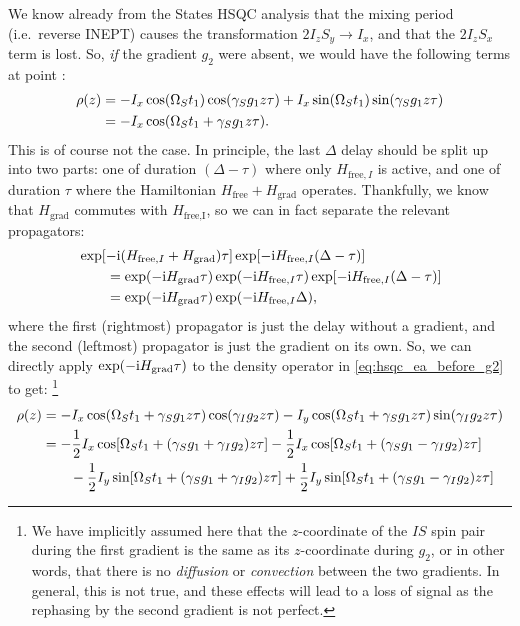 We know already from the States HSQC analysis that the mixing period (i.e.\ reverse INEPT) causes the transformation $2I_zS_y \to I_x$, and that the $2I_zS_x$ term is lost.
So, \textit{if} the gradient $g_2$ were absent, we would have the following terms at point :
\begin{align}
    \label{eq:hsqc_ea_before_g2}
    \rho(z) &= -I_x\cos(\Omega_S t_1)\cos(\gamma_S g_1 z \tau) + I_x\sin(\Omega_S t_1)\sin(\gamma_S g_1 z \tau) \notag \\
            &= -I_x\cos(\Omega_S t_1 + \gamma_S g_1 z\tau).
\end{align}
This is of course not the case.
In principle, the last $\Delta$ delay should be split up into two parts: one of duration $(\Delta - \tau)$ where only $H_{\text{free},I}$ is active, and one of duration $\tau$ where the Hamiltonian $H_\text{free} + H_\text{grad}$ operates.
Thankfully, we know that $H_\text{grad}$ commutes with $H_\text{free,I}$, so we can in fact separate the relevant propagators:
\begin{align}
    \label{eq:propagators_gradient_echo}
    \MoveEqLeft \exp[-\mi(H_{\text{free},I} + H_\text{grad})\tau]\exp[-\mi H_{\text{free},I}(\Delta - \tau)] \notag \\
    &= \exp(-\mi H_\text{grad}\tau) \exp(-\mi H_{\text{free},I}\tau)\exp[-\mi H_{\text{free},I}(\Delta - \tau)] \notag \\
    &= \exp(-\mi H_\text{grad}\tau) \exp(-\mi H_{\text{free},I}\Delta),
\end{align}
where the first (rightmost) propagator is just the delay without a gradient, and the second (leftmost) propagator is just the gradient on its own.
So, we can directly apply $\exp(-\mathrm{i} H_\text{grad}\tau)$ to the density operator in \cref{eq:hsqc_ea_before_g2} to get:%
\footnote{We have implicitly assumed here that the $z$-coordinate of the $IS$ spin pair during the first gradient is the same as its $z$-coordinate during $g_2$, or in other words, that there is no \textit{diffusion} or \textit{convection} between the two gradients. In general, this is not true, and these effects will lead to a loss of signal as the rephasing by the second gradient is not perfect.}
\begin{align}
    \rho(z) &= -I_x\cos(\Omega_S t_1 + \gamma_S g_1 z \tau)\cos(\gamma_I g_2 z\tau) - I_y\cos(\Omega_S t_1 + \gamma_S g_1 z \tau)\sin(\gamma_I g_2 z\tau) \label{eq:hsqc_ea_after_g2_1} \\
            &= -\frac{1}{2}I_x \cos[\Omega_S t_1 + (\gamma_S g_1 + \gamma_I g_2)z\tau] -\frac{1}{2} I_x \cos[\Omega_S t_1 + (\gamma_S g_1 - \gamma_I g_2) z\tau]  \notag \\
            &\quad\quad - \frac{1}{2}I_y \sin[\Omega_S t_1 + (\gamma_S g_1 + \gamma_I g_2) z\tau] + \frac{1}{2}I_y \sin[\Omega_S t_1 + (\gamma_S g_1 - \gamma_I g_2) z\tau] 
            \label{eq:hsqc_ea_after_g2_2}
\end{align}
